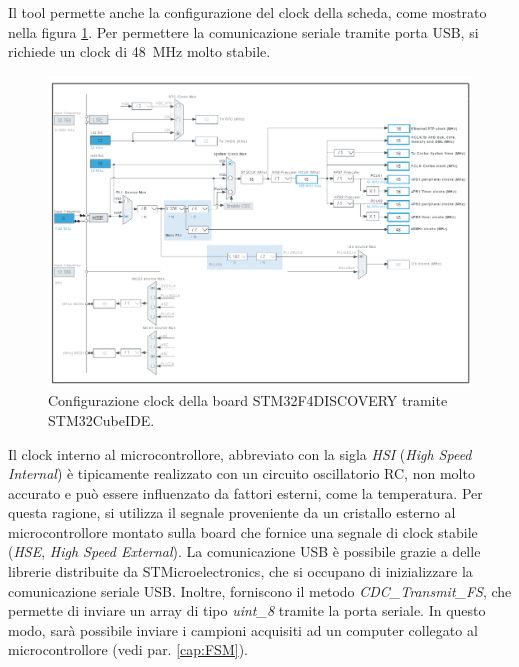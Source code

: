 Il tool permette anche la configurazione del clock della scheda, come mostrato nella figura \ref{fig:Clock}. Per permettere la comunicazione seriale tramite porta USB, si richiede un clock di \SI{48}{\mega\hertz} molto stabile. 
 \begin{figure}[tbh]
 	\centering
 	\includegraphics[width=1.4\linewidth, angle =90]{ImageFiles/Firmware/Clock}
 	\caption[Configurazione clock della board STM32F4DISCOVERY.]{Configurazione clock della board STM32F4DISCOVERY tramite STM32CubeIDE.}
 	\label{fig:Clock}
 \end{figure}
Il clock interno al microcontrollore, abbreviato con la sigla \textit{HSI} (\textit{High Speed Internal}) è tipicamente realizzato con un circuito oscillatorio RC, non molto accurato e può essere influenzato da fattori esterni, come la temperatura. Per questa ragione, si utilizza il segnale proveniente da un cristallo esterno al microcontrollore montato sulla board che fornice una segnale di clock stabile (\textit{HSE}, \textit{High Speed External}). La comunicazione USB è possibile grazie a delle librerie distribuite da STMicroelectronics, che si occupano di inizializzare la comunicazione seriale USB. Inoltre, forniscono il metodo \textit{CDC\_Transmit\_FS}, che permette di inviare un array di tipo \textit{uint\_8} tramite la porta seriale. In questo modo, sarà possibile inviare i campioni acquisiti ad un computer collegato al microcontrollore (vedi par. \ref{cap:FSM}).

\clearpage
